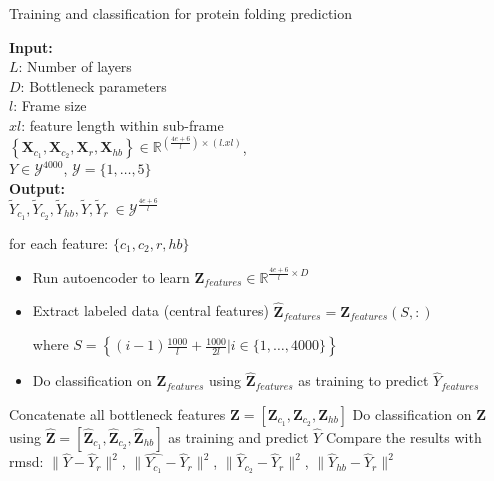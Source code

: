 \documentclass{article}
\newcommand{\mat}[1]{\mathbf{#1}}
\begin{document}
\begin{algorithm}
\caption{Training and classification for protein folding prediction}
\textbf{Input:}\\
$L$: Number of layers\\
$D$: Bottleneck parameters\\
$l$: Frame size \\
$xl$: feature length within sub-frame\\
$\left\{ \mat{X}_{c_1}, \mat{X}_{c_2}, \mat{X}_{r}, \mat{X}_{hb} \right\} \in \mathbb{R}^{(\frac{4e+6}{l}) \times (l . xl) } $,\\
${Y} \in \mathcal{Y}^{4000}$, $\mathcal{Y} = \{1, \dots ,5 \}$\\

\textbf{Output:} \\
$ {\tilde{Y}}_{c_1}, \tilde{Y}_{c_2}, \tilde{Y}_{hb}, \tilde{Y}, \tilde{Y}_{r} \ \in \mathcal{Y}^{\frac{4e+6}{l} } $\\
\label{alg:the_alg}
\begin{algorithmic}[1]
	\State for each feature: $\{ c_1, c_2, r, hb \}$
	\begin{itemize}
		\item Run autoencoder to learn $\mat{Z}_{features} \in \mathbb{R}^{\frac{4e+6}{l} \times D}$
		\item Extract labeled data (central features) $\hat{\mat{Z}}_{features} = \mat{Z}_{features}(S,:)$
		
		 where $S = \left\{ (i-1)\frac{1000}{l} + \frac{1000}{2l} | i \in \{1, \dots, 4000\} \right\}$
		 \item Do classification on $\mat{Z}_{features}$ using $\hat{\mat{Z}}_{features}$ as training to predict $\hat{{Y}}_{features}$
		\end{itemize} 
		
		\State Concatenate all bottleneck features $\mat{Z} = \left[ \mat{Z}_{c_1}, \mat{Z}_{c_2}, \mat{Z}_{hb} \right]$
		 \State Do classification on $\mat{Z}$ using $\hat{\mat{Z}}  = \left[ \hat{\mat{Z}}_{c_1}, \hat{\mat{Z}}_{c_2}, \hat{\mat{Z}}_{hb}  \right]$ as training and predict $\hat{{Y}}$
	\State Compare the results with rmsd: $\| \hat{Y} - \hat{Y}_r \|^2$, $\| \hat{Y_{c_1}} - \hat{Y}_r \|^2$, $\| \hat{Y}_{c_2} - \hat{Y}_r \|^2$, $\| \hat{Y}_{hb} - \hat{Y}_r \|^2$
\end{algorithmic}
\end{algorithm}
\end{document}
